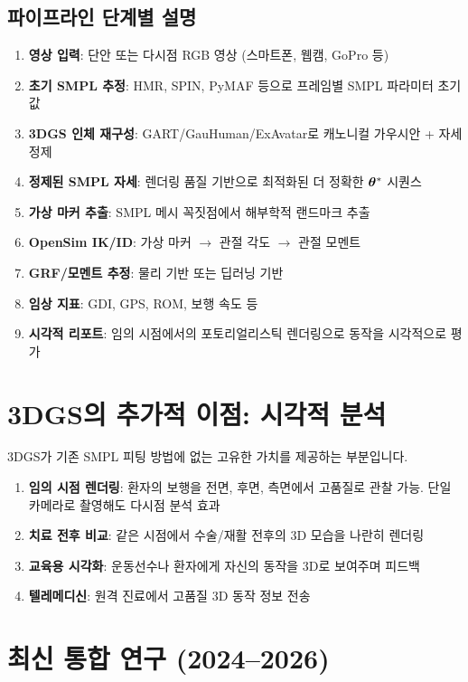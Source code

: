 \documentclass[11pt, a4paper]{report}
\begin{document}
\subsection{파이프라인 단계별 설명}

\begin{enumerate}[leftmargin=*]
  \item \textbf{영상 입력}: 단안 또는 다시점 RGB 영상 (스마트폰, 웹캠, GoPro 등)
  \item \textbf{초기 SMPL 추정}: HMR, SPIN, PyMAF 등으로 프레임별 SMPL 파라미터 초기값
  \item \textbf{3DGS 인체 재구성}: GART/GauHuman/ExAvatar로 캐노니컬 가우시안 + 자세 정제
  \item \textbf{정제된 SMPL 자세}: 렌더링 품질 기반으로 최적화된 더 정확한 $\bm{\theta}^*$ 시퀀스
  \item \textbf{가상 마커 추출}: SMPL 메시 꼭짓점에서 해부학적 랜드마크 추출
  \item \textbf{OpenSim IK/ID}: 가상 마커 $\rightarrow$ 관절 각도 $\rightarrow$ 관절 모멘트
  \item \textbf{GRF/모멘트 추정}: 물리 기반 또는 딥러닝 기반
  \item \textbf{임상 지표}: GDI, GPS, ROM, 보행 속도 등
  \item \textbf{시각적 리포트}: 임의 시점에서의 포토리얼리스틱 렌더링으로 동작을 시각적으로 평가
\end{enumerate}


\section{3DGS의 추가적 이점: 시각적 분석}

3DGS가 기존 SMPL 피팅 방법에 없는 고유한 가치를 제공하는 부분입니다.

\begin{enumerate}[leftmargin=*]
  \item \textbf{임의 시점 렌더링}: 환자의 보행을 전면, 후면, 측면에서 고품질로 관찰 가능. 단일 카메라로 촬영해도 다시점 분석 효과
  \item \textbf{치료 전후 비교}: 같은 시점에서 수술/재활 전후의 3D 모습을 나란히 렌더링
  \item \textbf{교육용 시각화}: 운동선수나 환자에게 자신의 동작을 3D로 보여주며 피드백
  \item \textbf{텔레메디신}: 원격 진료에서 고품질 3D 동작 정보 전송
\end{enumerate}


\section{최신 통합 연구 (2024--2026)}
\label{sec:recent_papers}
\end{document}
